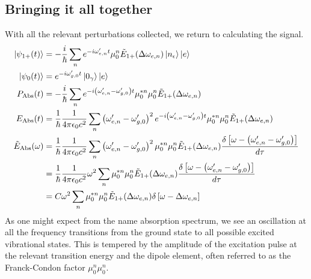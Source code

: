 \subsection{Bringing it all together}
With all the relevant perturbations collected, we return to calculating the signal.
\begin{align}
	\ket{\psi_{1+}(t)} &= -\frac{i}{\hbar} \sum_n e^{-i \omega'_{e, n} t}  \mu_{0}^{n}   \tilde{E}_{1+} (\Delta \omega_{e, n}) \ket{n_{\epsilon}}\ket{e} \\
	\ket{\psi_{0}(t)} &= e^{-i \omega'_{g, 0} t} \ket{0_{\gamma}}\ket{e} \\
	P_{\text{Abs}}(t) &= -\frac{i}{\hbar} \sum_n e^{-i \left( \omega'_{e, n} - \omega'_{g, 0} \right) t}  \mu_{0}^{*n}  \mu_{0}^{n} \tilde{E}_{1+} (\Delta \omega_{e, n}) \\
	E_{\text{Abs}}(t) &= \frac{1}{\hbar} \frac{1}{4 \pi \epsilon_0 c^2}\sum_n \left(\omega'_{e, n} - \omega'_{g, 0} \right)^2 e^{-i \left( \omega'_{e, n} - \omega'_{g, 0} \right) t}  \mu_{0}^{*n}  \mu_{0}^{n} \tilde{E}_{1+} (\Delta \omega_{e, n}) \\
	\tilde{E}_{\text{Abs}}(\omega) &= \frac{1 }{\hbar} \frac{1}{4 \pi \epsilon_0 c^2}\sum_n \left( \omega'_{e, n} - \omega'_{g, 0} \right)^2  \mu_{0}^{*n}  \mu_{0}^{n} \tilde{E}_{1+} (\Delta \omega_{e, n}) \frac{ \delta\left[ \omega -  \left( \omega'_{e, n} - \omega'_{g, 0} \right) \right] }{d\tau}\\
 	&= \frac{1 }{\hbar} \frac{1}{4 \pi \epsilon_0 c^2}\omega^2 \sum_n  \mu_{0}^{*n}  \mu_{0}^{n} \tilde{E}_{1+} (\Delta \omega_{e, n}) \frac{ \delta\left[ \omega -  \left( \omega'_{e, n} - \omega'_{g, 0} \right) \right] }{d\tau} \\
 	&= C \omega^2 \sum_n  \mu_{0}^{*n}  \mu_{0}^{n} \tilde{E}_{1+} (\Delta \omega_{e, n})  \delta\left[ \omega -  \Delta \omega_{e, n} \right]
\end{align}
As one might expect from the name absorption spectrum, we see an oscillation at all the frequency transitions from the ground state to all possible excited vibrational states.  This is tempered by the amplitude of the excitation pulse at the relevant transition energy and the dipole element, often referred to as the Franck-Condon factor $\mu_{0}^{n}  \mu_{0}^{n}$.

